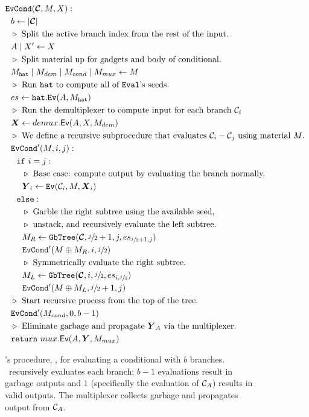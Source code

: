 \begin{figure}
  \begin{align*}
    &\evcond(\vec{\cir}, \mat, X):\\
    &~~b \gets | \vec{\cir} |\\
    &~~\codecomment{Split the active branch index from the rest of the
    input.}\\
    &~~\aid \mid X' \gets X\\
    &~~\codecomment{Split material up for gadgets and body of conditional.}\\
    &~~\mat_\gadget \mid \mat_{dem} \mid \mat_{cond} \mid \mat_{mux} \gets \mat\\
    &~~\codecomment{Run $\gadget$ to compute all of \E's seeds.}\\
    &~~es \gets \gadget.\mathtt{Ev}(\aid, \mat_\gadget)\\
    &~~\codecomment{Run the demultiplexer to compute input for each branch $\cir_i$}\\
    &~~\vec{X} \gets \evdem(\aid, X, \mat_{dem})\\
    &~~\codecomment{We define a recursive subprocedure that evaluates $\cir_i - \cir_j$ using material $\mat$.}\\
    &~~\evcond'(\mat, i, j):\\
    &~~~~\cif~i = j:\\
    &~~~~~~\codecomment{Base case: compute output by evaluating the branch normally.}\\
    &~~~~~~\gcirout_i \gets \ev(\cir_i, M, \gcirinp_i)\\
    &~~~~\celse:\\
    &~~~~~~\codecomment{Garble the right subtree using the available
    seed,}\\
    &~~~~~~\codecomment{unstack, and recursively evaluate the left
    subtree.}\\
    &~~~~~~\mat_R \gets \gbtree(\vec{\cir}, \sfrac{j}{2}+1, j, es_{\sfrac{j}{2}+1, j})\\
    &~~~~~~\evcond'(\mat \oplus \mat_R, i, \sfrac{j}{2})\\
    &~~~~~~\codecomment{Symmetrically evaluate the right subtree.}\\
    &~~~~~~\mat_L \gets \gbtree(\vec{\cir}, i, \sfrac{j}{2}, es_{i,\sfrac{j}{2}})\\
    &~~~~~~\evcond'(\mat \oplus \mat_L, \sfrac{j}{2}+1, j)\\
    &~~\codecomment{Start recursive process from the top of the tree.}\\
    &~~\evcond'(M_{cond}, 0, b-1)\\
    &~~\codecomment{Eliminate garbage and propagate $\vec{Y}_\aid$ via
    the multiplexer.}\\
    &~~\creturn~\evmux(\aid, \vec{Y}, M_{mux})
  \end{align*}
  \caption{%
    \E's procedure, \evcond, for evaluating a conditional with $b$ branches.
    \evcond\ recursively evaluates each branch; $b-1$ evaluations
    result in garbage outputs and $1$ (specifically the evaluation of
    $\mathcal C_{A}$) results in valid outputs.
    The multiplexer collects garbage and propagates output from
    $\mathcal C_{A}$.
  }
\end{figure}


